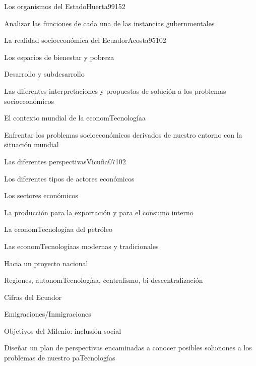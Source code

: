 \begin{syllabus}
\begin{unit}{Los organismos del Estado}{Huerta99}{15}{2}
   \begin{unitgoals}
      \item Analizar las funciones de cada una de las instancias gubernmentales
   \end{unitgoals}
\end{unit}

\begin{unit}{La realidad socioeconómica del Ecuador}{Acosta95}{10}{2}
   \begin{topics}
      \item Los espacios de bienestar y pobreza
	\item Desarrollo y subdesarrollo
	\item Las diferentes interpretaciones y propuestas de solución a los problemas socioeconómicos
	\item El contexto mundial de la economTecnologíaa
   \end{topics}

   \begin{unitgoals}
      \item Enfrentar los problemas socioeconómicos derivados de nuestro entorno con la situación mundial
   \end{unitgoals}
\end{unit}

\begin{unit}{Las diferentes perspectivas}{Vicuña07}{10}{2}
   \begin{topics}
      \item Los diferentes tipos de actores económicos
	\item Los sectores económicos
	\item La producción para la exportación y para el consumo interno
	\item La economTecnologíaa del petróleo
	\item Las economTecnologíaas modernas y tradicionales
	\item Hacia un proyecto nacional
	\item Regiones, autonomTecnologíaa, centralismo, bi-descentralización
	\item Cifras del Ecuador
	\item Emigraciones/Inmigraciones
	\item Objetivos del Milenio: inclusión social 
   \end{topics}

   \begin{unitgoals}
      \item Diseñar un plan de perspectivas encaminadas a conocer posibles soluciones a los problemas de nuestro paTecnologías
   \end{unitgoals}
\end{unit}

\begin{coursebibliography}
\end{coursebibliography}
\end{syllabus}
